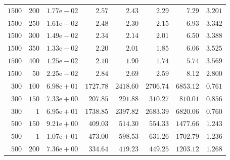 \begin{table}
{\begin{tabular}{rrlrrrrr}
    $1500$ & $200$ & $1.77\text{e}-02$ & $2.57$ & $2.43$ & $2.29$ & $7.29$ & $3.201$ \\
    $1500$ & $250$ & $1.61\text{e}-02$ & $2.48$ & $2.30$ & $2.15$ & $6.93$ & $3.342$ \\
    $1500$ & $300$ & $1.49\text{e}-02$ & $2.34$ & $2.14$ & $2.01$ & $6.50$ & $3.388$ \\
    $1500$ & $350$ & $1.33\text{e}-02$ & $2.20$ & $2.01$ & $1.85$ & $6.06$ & $3.525$ \\
    $1500$ & $400$ & $1.25\text{e}-02$ & $2.10$ & $1.90$ & $1.74$ & $5.74$ & $3.569$ \\
    $1500$ & $50$ & $2.25\text{e}-02$ & $2.84$ & $2.69$ & $2.59$ & $8.12$ & $2.800$ \\
    $300$ & $100$ & $6.98\text{e}+01$ & $1727.78$ & $2418.60$ & $2706.74$ & $6853.12$ & $0.761$ \\
    $300$ & $150$ & $7.33\text{e}+00$ & $207.85$ & $291.88$ & $310.27$ & $810.01$ & $0.856$ \\
    $300$ & $1$ & $6.95\text{e}+01$ & $1738.85$ & $2397.82$ & $2683.39$ & $6820.06$ & $0.760$ \\
    $500$ & $150$ & $9.21\text{e}+00$ & $409.03$ & $514.30$ & $554.33$ & $1477.66$ & $1.243$ \\
    $500$ & $1$ & $1.07\text{e}+01$ & $473.00$ & $598.53$ & $631.26$ & $1702.79$ & $1.236$ \\
    $500$ & $200$ & $7.36\text{e}+00$ & $334.64$ & $419.23$ & $449.25$ & $1203.12$ & $1.268$ \\


\end{tabular}}
\end{table}
